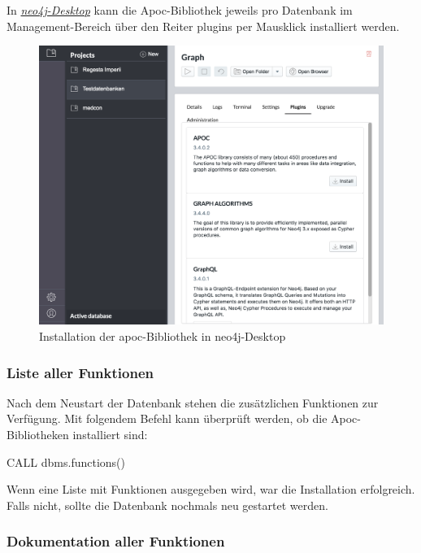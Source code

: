 In \href{https://neo4j.com/download/}{\emph{neo4j-Desktop}} kann die
Apoc-Bibliothek jeweils pro Datenbank im Management-Bereich über den
Reiter plugins per Mausklick installiert werden.

\begin{figure}
\centering
\includegraphics{Bilder/cypherFortgeschrittene/neo4j-Desktop-install-apoc.png}
\caption{Installation der apoc-Bibliothek in neo4j-Desktop}
\end{figure}

\hypertarget{liste-aller-funktionen}{%
\subsubsection{Liste aller Funktionen}\label{liste-aller-funktionen}}

Nach dem Neustart der Datenbank stehen die zusätzlichen Funktionen zur
Verfügung. Mit folgendem Befehl kann überprüft werden, ob die
Apoc-Bibliotheken installiert sind:

CALL dbms.functions()

Wenn eine Liste mit Funktionen ausgegeben wird, war die Installation
erfolgreich. Falls nicht, sollte die Datenbank nochmals neu gestartet
werden.

\hypertarget{dokumentation-aller-funktionen}{%
\subsubsection{Dokumentation aller
Funktionen}\label{dokumentation-aller-funktionen}}

